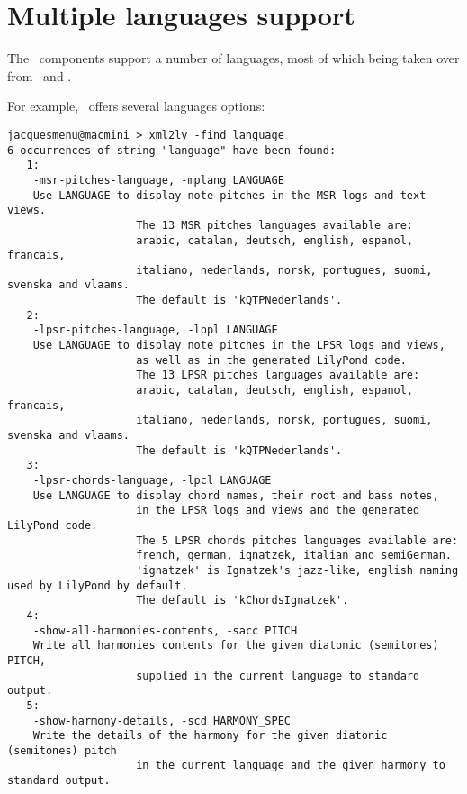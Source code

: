 
\chapter{Multiple languages support}

The \mf\ components support a number of languages, most of which being taken over from \mxml\ and \lily.

For example, \xmlToLy\ offers several languages options:
\begin{lstlisting}[language=Terminal]
jacquesmenu@macmini > xml2ly -find language
6 occurrences of string "language" have been found:
   1:
    -msr-pitches-language, -mplang LANGUAGE
    Use LANGUAGE to display note pitches in the MSR logs and text views.
                    The 13 MSR pitches languages available are:
                    arabic, catalan, deutsch, english, espanol, francais,
                    italiano, nederlands, norsk, portugues, suomi, svenska and vlaams.
                    The default is 'kQTPNederlands'.
   2:
    -lpsr-pitches-language, -lppl LANGUAGE
    Use LANGUAGE to display note pitches in the LPSR logs and views,
                    as well as in the generated LilyPond code.
                    The 13 LPSR pitches languages available are:
                    arabic, catalan, deutsch, english, espanol, francais,
                    italiano, nederlands, norsk, portugues, suomi, svenska and vlaams.
                    The default is 'kQTPNederlands'.
   3:
    -lpsr-chords-language, -lpcl LANGUAGE
    Use LANGUAGE to display chord names, their root and bass notes,
                    in the LPSR logs and views and the generated LilyPond code.
                    The 5 LPSR chords pitches languages available are:
                    french, german, ignatzek, italian and semiGerman.
                    'ignatzek' is Ignatzek's jazz-like, english naming used by LilyPond by default.
                    The default is 'kChordsIgnatzek'.
   4:
    -show-all-harmonies-contents, -sacc PITCH
    Write all harmonies contents for the given diatonic (semitones) PITCH,
                    supplied in the current language to standard output.
   5:
    -show-harmony-details, -scd HARMONY_SPEC
    Write the details of the harmony for the given diatonic (semitones) pitch
                    in the current language and the given harmony to standard output.

\end{lstlisting}
